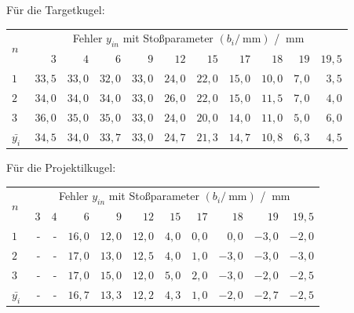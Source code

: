 \documentclass[twoside]{article}
\begin{document}
            Für die Targetkugel:
            \begin{center}
                \begin{tabular}{l rrrrrrrrrr}
                    \toprule
                    \multirow{2}{*}{$n$~} & \multicolumn{10}{c}{Fehler $y_{in}$ mit Stoßparameter $\left(b_i/\SI{}{\milli\meter}\right)$ / $\SI{}{\milli\meter}$}  \\
                    \cmidrule{2-11} & $3$ & $4$ & $6$ & $9$ & $12$ & $15$ & $17$ & $18$ & $19$ & $19,5$ \\
                    \midrule
                    $1$ & $33,5$ & $33,0$ & $32,0$ & $33,0$ & $24,0$ & $22,0$ & $15,0$ & $10,0$ & $7,0$ & $3,5$ \\
                    $2$ & $34,0$ & $34,0$ & $34,0$ & $33,0$ & $26,0$ & $22,0$ & $15,0$ & $11,5$ & $7,0$ & $4,0$ \\
                    $3$ & $36,0$ & $35,0$ & $35,0$ & $33,0$ & $24,0$ & $20,0$ & $14,0$ & $11,0$ & $5,0$ & $6,0$ \\
                    \midrule
                    $\bar{y_i}$ & $34,5$ & $34,0$ & $33,7$ & $33,0$ & $24,7$ & $21,3$ & $14,7$ & $10,8$ & $6,3$ & $4,5$ \\
                    \bottomrule
                \end{tabular}
            \end{center}
            \vspace{0.5\baselineskip}

            Für die Projektilkugel:
            \begin{center}
                \begin{tabular}{l rrrrrrrrrr}
                    \toprule
                    \multirow{2}{*}{$n$~} & \multicolumn{10}{c}{Fehler $y_{in}$ mit Stoßparameter $\left(b_i/\SI{}{\milli\meter}\right)$ / $\SI{}{\milli\meter}$}  \\
                    \cmidrule{2-11} & $3$ & $4$ & $6$ & $9$ & $12$ & $15$ & $17$ & $18$ & $19$ & $19,5$ \\
                    \midrule
                    $1$ & - & - & $16,0$ & $12,0$ & $12,0$ & $4,0$ & $0,0$ & $0,0$ & $-3,0$ & $-2,0$ \\
                    $2$ & - & - & $17,0$ & $13,0$ & $12,5$ & $4,0$ & $1,0$ & $-3,0$ & $-3,0$ & $-3,0$ \\
                    $3$ & - & - & $17,0$ & $15,0$ & $12,0$ & $5,0$ & $2,0$ & $-3,0$ & $-2,0$ & $-2,5$ \\
                    \midrule
                    $\bar{y_i}$ & - & - & $16,7$ & $13,3$ & $12,2$ & $4,3$ & $1,0$ & $-2,0$ & $-2,7$ & $-2,5$ \\
                    \bottomrule
                \end{tabular}
            \end{center}
\end{document}
